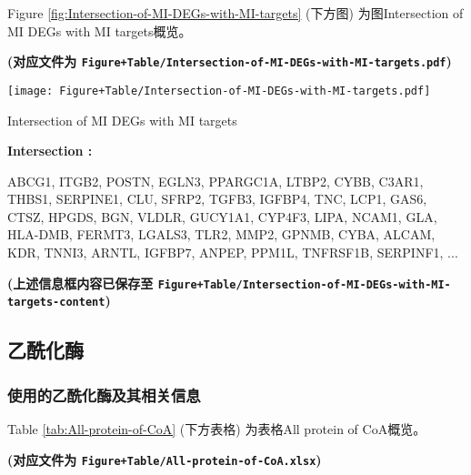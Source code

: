 \documentclass[
]{article}
\begin{document}
Figure \ref{fig:Intersection-of-MI-DEGs-with-MI-targets} (下方图) 为图Intersection of MI DEGs with MI targets概览。

\textbf{(对应文件为 \texttt{Figure+Table/Intersection-of-MI-DEGs-with-MI-targets.pdf})}

\def\@captype{figure}
\begin{center}
\texttt{[image: Figure+Table/Intersection-of-MI-DEGs-with-MI-targets.pdf]}
\caption{Intersection of MI DEGs with MI targets}\label{fig:Intersection-of-MI-DEGs-with-MI-targets}
\end{center}
\begin{center}\begin{tcolorbox}[colback=gray!10, colframe=gray!50, width=0.9\linewidth, arc=1mm, boxrule=0.5pt]
\textbf{
Intersection
:}

\vspace{0.5em}

    ABCG1, ITGB2, POSTN, EGLN3, PPARGC1A, LTBP2, CYBB,
C3AR1, THBS1, SERPINE1, CLU, SFRP2, TGFB3, IGFBP4, TNC,
LCP1, GAS6, CTSZ, HPGDS, BGN, VLDLR, GUCY1A1, CYP4F3, LIPA,
NCAM1, GLA, HLA-DMB, FERMT3, LGALS3, TLR2, MMP2, GPNMB,
CYBA, ALCAM, KDR, TNNI3, ARNTL, IGFBP7, ANPEP, PPM1L,
TNFRSF1B, SERPINF1, ...

\vspace{2em}
\end{tcolorbox}
\end{center}

\textbf{(上述信息框内容已保存至 \texttt{Figure+Table/Intersection-of-MI-DEGs-with-MI-targets-content})}

\hypertarget{ux4e59ux9170ux5316ux9176}{%
\subsection{乙酰化酶}\label{ux4e59ux9170ux5316ux9176}}

\hypertarget{ux4f7fux7528ux7684ux4e59ux9170ux5316ux9176ux53caux5176ux76f8ux5173ux4fe1ux606f}{%
\subsubsection{使用的乙酰化酶及其相关信息}\label{ux4f7fux7528ux7684ux4e59ux9170ux5316ux9176ux53caux5176ux76f8ux5173ux4fe1ux606f}}

Table \ref{tab:All-protein-of-CoA} (下方表格) 为表格All protein of CoA概览。

\textbf{(对应文件为 \texttt{Figure+Table/All-protein-of-CoA.xlsx})}
\end{document}
